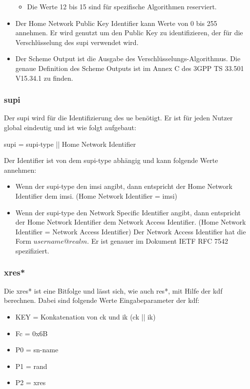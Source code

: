 \begin{itemize}
\begin{itemize}
\item Die Werte 12 bis 15 sind für spezifische Algorithmen reserviert.
\end{itemize}
\item Der Home Network Public Key Identifier kann Werte von 0 bis 255 annehmen.
Er wird genutzt um den Public Key zu identifizieren, der für die Verschlüsselung des \gls{supi} verwendet wird.
\item Der Scheme Output ist die Ausgabe des Verschlüsselungs-Algorithmus.
Die genaue Definition des Scheme Outputs ist im Annex C des 3GPP TS 33.501 V15.34.1 zu finden. %
\end{itemize}

\subsubsection{\gls{supi}}
Der \gls{supi} wird für die Identifizierung des \gls{ue} benötigt.
Er ist für jeden Nutzer global eindeutig und ist wie folgt aufgebaut: %

\gls{supi} = \gls{supi-type} || Home Network Identifier

Der Identifier ist von dem \gls{supi-type} abhängig und kann folgende Werte annehmen:

\begin{itemize}
\item Wenn der \gls{supi-type} den \gls{imsi} angibt, dann entspricht der Home Network Identifier dem \gls{imsi}. (Home Network Identifier = \gls{imsi})
\item Wenn der \gls{supi-type} den Network Specific Identifier angibt, dann entspricht der Home Network Identifier dem Network Access Identifier. (Home Network Identifier = Network Access Identifier)
Der Network Access Identifier hat die Form $ username@realm $. 
Er ist genauer im Dokument IETF RFC 7542 spezifiziert. %
\end{itemize}

\subsubsection{\gls{xres*}}
Die \gls{xres*} ist eine Bitfolge und lässt sich, wie auch \gls{res*}, mit Hilfe der \gls{kdf} berechnen.
Dabei sind folgende Werte Eingabeparameter der \gls{kdf}: %
\begin{itemize}
\item KEY = Konkatenation von \gls{ck} und \gls{ik} (\gls{ck} || \gls{ik})
\item Fc = 0x6B
\item P0 = \gls{sn-name}
\item P1 = \gls{rand}
\item P2 = \gls{xres}
\end{itemize}

